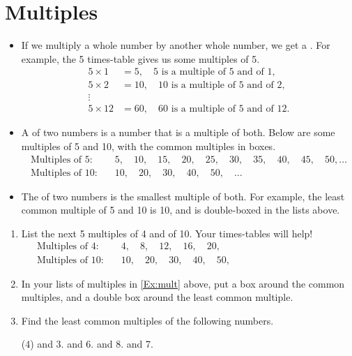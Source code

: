 \documentclass[12pt]{article}
\newcounter{exercisenum}
\newenvironment{exercises}{%
  \begin{tcolorbox}[colback=white,colframe=black,arc=0pt,breakable]
  \begin{enumerate}[label=\arabic*),leftmargin=1cm,resume=exercises]
  \setcounter{enumi}{\value{exercisenum}}
}{%
  \setcounter{exercisenum}{\value{enumi}}
  \end{enumerate}
  \end{tcolorbox}
}
\begin{document}
\section{Multiples}
\begin{itemize}
\item
If we multiply a whole number by another whole number, we get a . For example, the 5 times-table gives us some multiples of 5. 
\begin{align*}
5\times 1 &= 5, \quad \text{$5$ is a multiple of $5$ and of $1$,}\\
5\times 2 &= 10, \quad \text{$10$ is a multiple of $5$ and of $2$,}\\ 
\vdots\\
5 \times 12 &= 60, \quad \text{$60$ is a multiple of $5$ and of $12$.}
\end{align*}
\item
A  of two numbers is a number that is a multiple of both. Below are some multiples of 5 and 10, with the common multiples in boxes.
\begin{align*}
\text{Multiples of 5:}\quad & 5,\quad\boxed{\boxed{10}},\quad 15,\quad\boxed{20},\quad 25,\quad\boxed{30},\quad 35,\quad\boxed{40},\quad 45,\quad\boxed{50},\ldots \\
\text{Multiples of 10:}\quad & \boxed{\boxed{10}},\quad \boxed{20},\quad \boxed{30},\quad \boxed{40},\quad \boxed{50},\quad \ldots
\end{align*}
\item
The  of two numbers is the smallest  multiple of both. For example, the least common multiple of 5 and 10 is 10, and is double-boxed in the lists above.
\end{itemize}

\begin{exercises}
\item
\label{Ex:mult}
List the next 5 multiples of 4 and of 10. Your times-tables will help! 
\begin{align*}
\text{Multiples of 4:}\quad & 4, \quad 8,\quad 12,\quad 16,\quad 20,\quad \phantom{24, \quad 28, \quad 32, \quad 36, \quad 40}\\
\text{Multiples of 10:}\quad & 10,\quad 20,\quad 30,\quad 40,\quad 50, \phantom{60, \quad 70,\quad 80,\quad 90,\quad 100}
\end{align*}
\item
In your lists of multiples in \ref{Ex:mult} above, put a box around the common multiples, and a double box around the least common multiple.
\item
Find the least common multiples of the following numbers.
\begin{tasks}(4)
 and 3.
 and 6.
 and 8.
 and 7.
\end{tasks}
\end{exercises}
\end{document}
